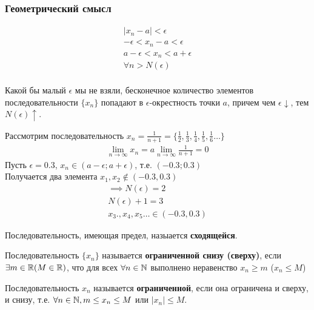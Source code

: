 \subsubsection{Геометрический смысл}
\begin{gather*}
|x_{n} - a| < \epsilon \\
- \epsilon< x_{n} - a < \epsilon \\
a - \epsilon < x_{n} < a + \epsilon \\
\forall n > N(\epsilon) \\
\end{gather*}

Какой бы малый $\epsilon$ мы не взяли, бесконечное количество элементов последовательности $\{x_{n}\}$ попадают в $\epsilon$-окрестность точки $a$, причем чем $\epsilon \downarrow$, тем  $N(\epsilon) \uparrow$.

\begin{eg}
  Рассмотрим последовательность $x_{n} = \frac{1}{n+1} = \{ \frac{1}{2}, \frac{1}{3}, \frac{1}{4}, \frac{1}{5}, \frac{1}{6}\ldots \} $
  \begin{gather*}
    \lim_{n \to \infty} x_{n} = a
    \lim_{n \to \infty} \frac{1}{n+1} = 0
  \end{gather*}
  Пусть $\epsilon = 0.3$, $x_{n}\in (a-\epsilon; a+\epsilon)$, т.е. $(-0.3; 0.3)$ \\
  Получается два элемента $x_1, x_2 \not\in (-0.3, 0.3)$
  \begin{gather*}
    \implies N(\epsilon) = 2 \\
    N(\epsilon) + 1 = 3 \\
    x_3., x_4, x_5 \ldots \in (-0.3, 0.3) 
  \end{gather*}
\end{eg}

\begin{definition}
  Последовательность, имеющая предел, назыается \textbf{сходящейся}.
\end{definition}

\begin{definition}
  Последовательность $\{x_{n}\} $ называется \textbf{ограниченной снизу (сверху)}, если $\exists m \in \mathbb{R} (M \in \mathbb{R})$, что для всех $\forall n \in \mathbb{N}$ выполнено неравенство $x_{n} \ge m$ ($x_{n} \le M$)
\end{definition}

\begin{definition}
  Последовательность $x_{n}$ называется \textbf{ограниченной}, если она ограничена и сверху, и снизу, т.е. $\forall n \in \mathbb{N}, m \le x_{n} \le M$ или $|x_{n}| \le M$.
\end{definition}

